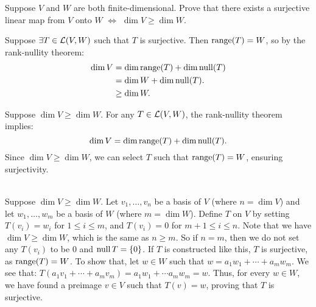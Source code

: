 \begin{xrcs}
  Suppose $V$ and $W$ are both finite-dimensional. Prove that there exists a surjective linear map from $V$ onto $W$ $\iff$ $\dim V \geq \dim W$.

  \begin{xprf}
    \Rightarrowdirection Suppose $\exists T \in \mathcal{L}(V,W)$ such that $T$ is surjective. Then $\operatorname{range}(T) = W$, so by the rank-nullity theorem:
    \begin{equation}
      \begin{aligned}
        \dim V &=    \dim \operatorname{range}(T) + \dim \operatorname{null}(T) \\
        &=    \dim W + \dim \operatorname{null}(T). \\
        &\geq \dim W.
      \end{aligned}
    \end{equation}

    \Leftarrowdirection Suppose $\dim V \geq \dim W$. For any $T \in \mathcal{L}(V,W)$, the rank-nullity theorem implies:
    \begin{equation}
      \dim V = \dim \operatorname{range}(T) + \dim \operatorname{null}(T).
    \end{equation}
    Since $\dim V \geq \dim W$, we can select $T$ such that $\operatorname{range}(T) = W$, ensuring surjectivity.

     \\
    Suppose $\dim V \geq \dim W$. Let $v_1, \dots, v_n$ be a basis of $V$ (where $n = \dim V$) and let $w_1, \dots, w_m$ be a basis of $W$ (where $m = \dim W$).  Define $T$ on $V$ by setting $T(v_i) = w_i$ for $1 \leq i \leq m$, and $T(v_i) = 0$ for $m+1 \leq i \leq n$. Note that we have $\dim V \geq \dim W$, which is the same as $n \geq m$. So if $n = m$, then we do not set any $T(v_i)$ to be $0$ and $\operatorname{null} T = \{0\}$. If $T$ is constructed like this, $T$ is surjective, as $\operatorname{range}(T) = W$. To show that, let $w \in W$ such that
    $
    w = a_1 w_1 + \cdots + a_m w_m.
    $
    We see that: $T(a_1 v_1 + \cdots + a_m v_m)= a_1 w_1 + \cdots a_m w_m = w$. Thus, for every $w \in W$, we have found a preimage $v \in V$ such that $T(v) = w$, proving that $T$ is surjective.
  \end{xprf}
\end{xrcs}


